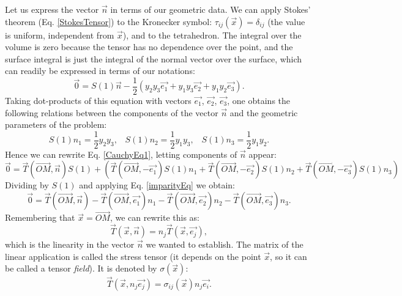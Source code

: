 \documentclass[DIV=12]{article}
\begin{document}
 Let us express the vector $\vec{n}$ in terms of our geometric data. 
 We can apply Stokes' theorem (Eq. \ref{StokesTensor}) to the Kronecker symbol:
  $\tau_{ij} (\vec{x})= \delta_{ij}$ (the value is uniform, independent from 
 $\vec{x}$), and to the tetrahedron. The integral over the volume is zero because the tensor has no dependence
 over the point, and the surface integral is just the integral of the normal vector
 over the surface, which can readily be expressed in terms of our notations:
 \begin{equation}
 \vec{0} = S(1) \vec{n} -  \frac{1}{2}\left(  y_2y_3 \vec{e_1}
    +   y_1y_3\vec{e_2}
     +  y_1y_2\vec{e_3}
   \right).
 \end{equation}
 Taking dot-products of this equation with vectors $\vec{e_1}$,  $\vec{e_2}$,  $\vec{e_3}$,
 one obtains the following relations between the components of the vector $\vec{n}$ and the
 geometric parameters of the problem:
 \begin{equation}
 S(1) n_1 =\frac{1}{2}  y_2y_3,\;\;\;  S(1) n_2 =  \frac{1}{2}y_1y_3,\;\;\; S(1) n_3 =\frac{1}{2} y_1y_2.
\label{sneqs}
\end{equation}
 Hence we can rewrite Eq. \ref{CauchyEq1}, letting components of $\vec{n}$ appear:
\begin{equation}
 \vec{0} = \vec{T}(\overrightarrow{OM}, \vec{n} ) S(1)+  \left( \vec{T}(\overrightarrow{OM}, -\vec{e_1} ) S(1)n_1
+ \vec{T}(\overrightarrow{OM}, -\vec{e_2} )S(1) n_2
  + \vec{T}(\overrightarrow{OM}, -\vec{e_3} ) S(1) n_3
   \right) 
\label{CauchyEq}
 \end{equation}
Dividing by $S(1)$ and applying Eq. \ref{imparityEq} we obtain:
\begin{equation}
\vec{0}=  \vec{T}(\overrightarrow{OM}, \vec{n} ) - \vec{T}(\overrightarrow{OM}, \vec{e_1} ) n_1
 - \vec{T}(\overrightarrow{OM}, \vec{e_2} ) n_2
  - \vec{T}(\overrightarrow{OM}, \vec{e_3} ) n_3.
\label{CauchyEq}
 \end{equation}
 Remembering that $\vec{x}= \overrightarrow{OM}$, we can rewrite this as: 
 \begin{equation}
 \vec{T}(\vec{x}, \vec{n} ) = n_j \vec{T}(\vec{x}, \vec{e_j} ),
 \end{equation}
 which is the linearity in the vector $\vec{n}$ we wanted to establish. The matrix 
  of the linear application is called the stress tensor (it depends on the point $\vec{x}$, so it can be called a 
 tensor {\emph{field}}). It is denoted by $\sigma(\vec{x})$:
 \begin{equation}
\boxed{
  \vec{T}(\vec{x}, n_j\vec{e_j} ) = \sigma_{ij}( \vec{x}) n_j \vec{e_i}.}
\label{sigmaDef}
 \end{equation}
\end{document}
